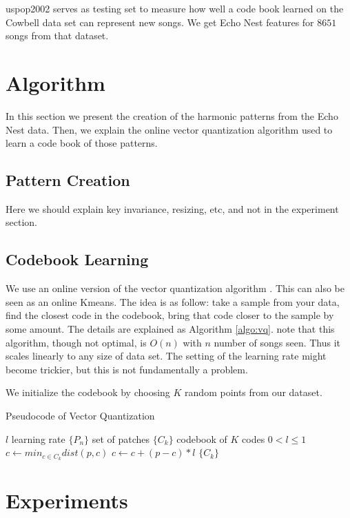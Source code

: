 \documentclass{article}
\begin{document}
uspop2002 serves as testing set to measure how well a code book learned on
the Cowbell data set can represent new songs. We get Echo Nest features
for $8651$ songs from that dataset.

\section{Algorithm}\label{sec:algo}
In this section we present the creation of the harmonic patterns from
the Echo Nest data. Then, we explain the online vector quantization algorithm
used to learn a code book of those patterns.

\subsection{Pattern Creation}
Here we should explain key invariance, resizing, etc, and not in the
experiment section.


\subsection{Codebook Learning}
We use an online version of the vector quantization algorithm 
\cite{Gersho1991}. This can also be seen as an online Kmeans.
The idea is as follow: take a sample from your data, find the closest
code in the codebook, bring that code closer to the sample by some amount.
The details are explained as Algorithm \ref{algo:vq}. note that this
algorithm, though not optimal, is $O(n)$ with $n$ number of songs seen.
Thus it scales linearly to any size of data set. The setting of the learning
rate might become trickier, but this is not fundamentally a problem.


We initialize the codebook by choosing $K$ random points from our dataset.


\begin{algorithm}
\caption{Pseudocode of Vector Quantization}
\label{algo:vq}
\begin{algorithmic}
\STATE$l$ learning rate
\STATE$\{P_n\}$ set of patches
\STATE$\{C_k\}$ codebook of $K$ codes
\REQUIRE $0 < l \leq 1$
\STATE$c \leftarrow min_{c \in C_k} dist(p,c)$
\STATE$c \leftarrow c + (p - c) * l$
\ENDFOR
\ENDFOR
\RETURN $\{C_k\}$
\end{algorithmic}
\end{algorithm}






\section{Experiments}\label{sec:experiments}
\end{document}
